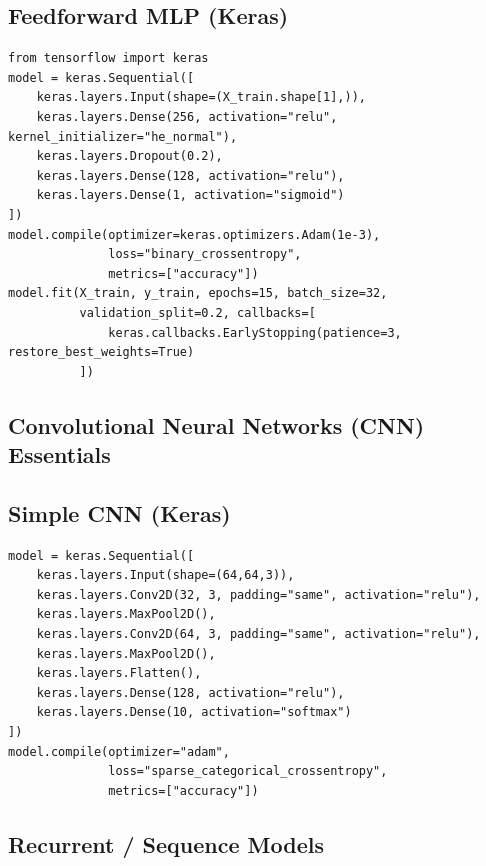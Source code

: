 \subsection*{Feedforward MLP (Keras)}
\begin{lstlisting}
from tensorflow import keras
model = keras.Sequential([
    keras.layers.Input(shape=(X_train.shape[1],)),
    keras.layers.Dense(256, activation="relu", kernel_initializer="he_normal"),
    keras.layers.Dropout(0.2),
    keras.layers.Dense(128, activation="relu"),
    keras.layers.Dense(1, activation="sigmoid")
])
model.compile(optimizer=keras.optimizers.Adam(1e-3),
              loss="binary_crossentropy",
              metrics=["accuracy"])
model.fit(X_train, y_train, epochs=15, batch_size=32,
          validation_split=0.2, callbacks=[
              keras.callbacks.EarlyStopping(patience=3, restore_best_weights=True)
          ])
\end{lstlisting}

\subsection*{Convolutional Neural Networks (CNN) Essentials}

\subsection*{Simple CNN (Keras)}
\begin{lstlisting}
model = keras.Sequential([
    keras.layers.Input(shape=(64,64,3)),
    keras.layers.Conv2D(32, 3, padding="same", activation="relu"),
    keras.layers.MaxPool2D(),
    keras.layers.Conv2D(64, 3, padding="same", activation="relu"),
    keras.layers.MaxPool2D(),
    keras.layers.Flatten(),
    keras.layers.Dense(128, activation="relu"),
    keras.layers.Dense(10, activation="softmax")
])
model.compile(optimizer="adam",
              loss="sparse_categorical_crossentropy",
              metrics=["accuracy"])
\end{lstlisting}

\subsection*{Recurrent / Sequence Models}

